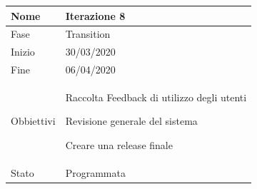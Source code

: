 \begin{center}
\begin{tabular}{ |p{2cm}|p{10cm}|  }
\hline
Nome & Iterazione 8 \\\hline
Fase & Transition \\\hline
Inizio & 30/03/2020 \\\hline
Fine &  06/04/2020  \\\hline
Obbiettivi & 
	\begin{compactitem}
		\item Raccolta Feedback di utilizzo degli utenti
		\item Revisione generale del sistema
		\item Creare una release finale
	\end{compactitem}\\\hline
Stato &  Programmata \\\hline
\end{tabular}
\label{table:8}\newline


\end{center}